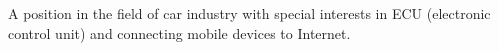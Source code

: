 A position in the field of car industry
with special interests in ECU (electronic control unit)
    and connecting mobile devices to Internet.
